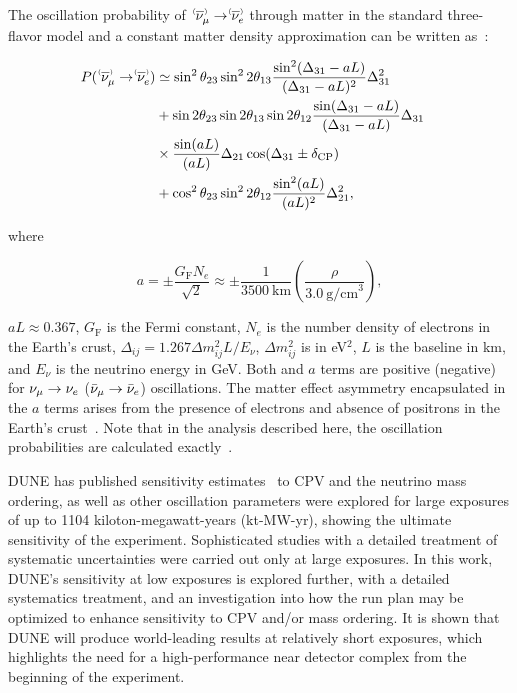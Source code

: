 The oscillation probability of $\;\nu^{\bracketbar}_\mu \rightarrow \nu^{\bracketbar}_e$ through matter in the standard three-flavor model and a constant matter density approximation can be written as~\cite{Nunokawa:2007qh}:
\begin{linenomath*}
  \begin{equation}
    \begin{aligned}
      P(\;\nu^{\bracketbar}_\mu \rightarrow \nu^{\bracketbar}_e) & \simeq \sin^2 \theta_{23} \sin^2 2 \theta_{13} 
      \frac{ \sin^2(\Delta_{31} - aL)}{(\Delta_{31}-aL)^2} \Delta_{31}^2 \\
      & + \sin 2 \theta_{23} \sin 2 \theta_{13} \sin 2 \theta_{12}\frac{ \sin(\Delta_{31} - aL)}{(\Delta_{31}-aL)} \Delta_{31} \\
      &\times \frac{\sin(aL)}{(aL)} \Delta_{21} \cos (\Delta_{31} \pm \deltacp) & \\
      & + \cos^2 \theta_{23} \sin^2 2 \theta_{12} \frac {\sin^2(aL)}{(aL)^2} \Delta_{21}^2,
    \end{aligned}
    \label{eqn:appprob}
  \end{equation}
\end{linenomath*}
where
\begin{linenomath*}
  \begin{equation*}
    a = \pm \frac{G_{\mathrm{F}}N_e}{\sqrt{2}} \approx \pm\frac{1}{3500~\mathrm{km}}\left(\frac{\rho}{3.0~\mathrm{g/cm}^{3}}\right),
  \end{equation*}
\end{linenomath*}
$aL \approx 0.367$, $G_{\mathrm{F}}$ is the Fermi constant, $N_e$ is the number density of electrons in the Earth's crust, $\Delta_{ij} = 1.267 \Delta m^2_{ij} L/E_\nu$, $\Delta m^2_{ij}$ is in eV$^{2}$, $L$ is the baseline in km, and $E_\nu$ is the neutrino energy in GeV.
Both \deltacp and $a$ terms are positive (negative) for $\nu_\mu \to \nu_e$ ($\bar\nu_\mu \to \bar\nu_e$) oscillations. The matter effect asymmetry encapsulated in the $a$ terms arises from the presence of electrons and absence of positrons in the Earth's crust~\cite{Wolfenstein:1977ue,Mikheev:1986gs}. Note that in the analysis described here, the oscillation probabilities are calculated exactly~\cite{Kopp:2006wp}.

DUNE has published sensitivity estimates~\cite{Abi:2020qib} to CPV and the neutrino mass ordering, as well as other oscillation parameters were explored for large exposures of up to 1104 kiloton-megawatt-years (kt-MW-yr), showing the ultimate sensitivity of the experiment. Sophisticated studies with a detailed treatment of systematic uncertainties were carried out only at large exposures. In this work, DUNE's sensitivity at low exposures is explored further, with a detailed systematics treatment, and an investigation into how the run plan may be optimized to enhance sensitivity to CPV and/or mass ordering. It is shown that DUNE will produce world-leading results at relatively short exposures, which highlights the need for a high-performance near detector complex from the beginning of the experiment. 

